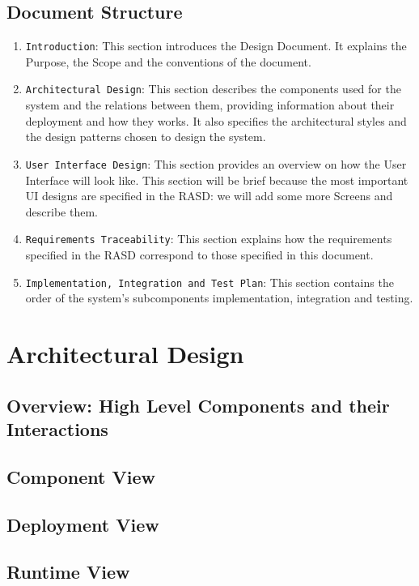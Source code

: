 \documentclass[11pt]{article} %
\begin{document}
\subsection{Document Structure}
\begin{enumerate}

\item \texttt{Introduction}: This section introduces the Design Document. It explains the Purpose, the Scope and the conventions of the document.
\item \texttt{Architectural Design}: This section describes the components used for the system and the relations between them, providing information about their deployment and how they works. It also specifies the architectural styles and the design patterns chosen to design the system.
\item \texttt{User Interface Design}: This section provides an overview on how the User Interface will look like. This section will be brief because the most important UI designs are specified in the RASD: we will add some more Screens and describe them. 
\item \texttt{Requirements Traceability}: This section explains how the requirements specified in the RASD correspond to those specified in this document.
\item \texttt{Implementation, Integration and Test Plan}: This section contains the order of the system's subcomponents implementation, integration and testing.

\end{enumerate}


\section{Architectural Design}

\subsection{Overview: High Level Components and their Interactions}


\subsection{Component View}

\subsection{Deployment View}

\subsection{Runtime View}
\end{document}
